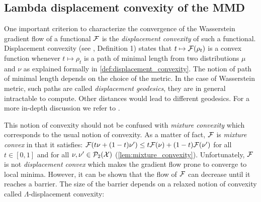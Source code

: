 


\subsection{Lambda displacement convexity of the MMD}\label{subsection:barrier_optimization}
One important criterion to characterize the convergence of the Wasserstein gradient flow of a functional ${{\mathcal F}}$ is the \textit{displacement convexity} of such a functional. Displacement convexity (see \cite{Villani:2004}, Definition 1) states that $t\mapsto {{\mathcal F}}(\rho_t)$ is a convex function whenever $t\mapsto\rho_t$ is a path of minimal length from two distributions $\mu$ and $\nu$ as explained formally in \cref{def:displacement_convexity}. The notion of path of minimal length depends on the choice of the metric. In the case of Wasserstein metric, such paths are called  \textit{displacement geodesics}, they are in general intractable to compute. Other distances would lead to different geodesics. For a more in-depth discussion we refer to \cite{Bottou:2017}.



This notion of convexity should not be confused with \textit{mixture convexity} which corresponds to the usual notion of convexity. As a matter of fact, ${{\mathcal F}}$ is \textit{mixture convex} in that it satisfies: ${{\mathcal F}}(t\nu +(1-t)\nu')\leq t{{\mathcal F}}(\nu)+(1-t){{\mathcal F}}(\nu')$ for all $t\in [0,1]$ and for all $\nu,\nu'\in\mathcal{P}_2({{\mathcal X}})$ (\cref{lem:mixture_convexity}). Unfortunately, ${{\mathcal F}}$ is not \textit{displacement convex} which makes the gradient flow prone to converge to local minima. However, it can be shown that the flow of ${{\mathcal F}}$ can decrease until it reaches a barrier. The size of the barrier depends on a relaxed notion of convexity called $\Lambda$-displacement convexity:

